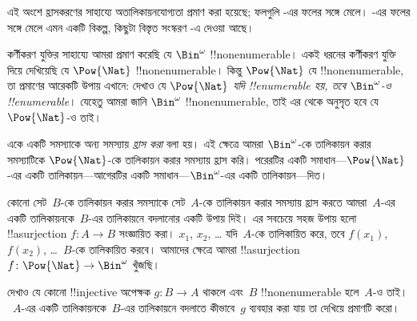 \documentclass[../../../include/open-logic-section]{subfiles}
\begin{document}


\begin{editorial}
  এই অংশে হ্রাসকরণের সাহায্যে অতালিকায়নযোগ্যতা প্রমাণ করা হয়েছে; ফলগুলি -এর ফলের সঙ্গে মেলে। -এর ফলের সঙ্গে মেলে এমন একটি বিকল্প, কিছুটা বিস্তৃত সংস্করণ -এ দেওয়া আছে।
\end{editorial}

কর্ণীকরণ যুক্তির সাহায্যে আমরা প্রমাণ করেছি যে $\Bin^\omega$ !!{nonenumerable}। একই ধরনের কর্ণীকরণ যুক্তি দিয়ে দেখিয়েছি যে $\Pow{\Nat}$ !!{nonenumerable}। কিন্তু $\Pow{\Nat}$ যে !!{nonenumerable}, তা প্রমাণের আরেকটি উপায় এখানে: দেখাও যে \emph{$\Pow{\Nat}$ যদি !!{enumerable} হয়, তবে $\Bin^\omega$-ও !!{enumerable}}। যেহেতু আমরা জানি $\Bin^\omega$ !!{nonenumerable}, তাই এর থেকে অনুসৃত হবে যে $\Pow{\Nat}$-ও তাই।

একে একটি সমস্যাকে অন্য সমস্যায় \emph{হ্রাস করা} বলা হয়। এই ক্ষেত্রে আমরা $\Bin^\omega$-কে তালিকায়ন করার সমস্যাটিকে $\Pow{\Nat}$-কে তালিকায়ন করার সমস্যায় হ্রাস করি। পরেরটির একটি সমাধান—$\Pow{\Nat}$-এর একটি তালিকায়ন—আগেরটির একটি সমাধান—$\Bin^\omega$-এর একটি তালিকায়ন—দিত।

কোনো সেট~$B$-কে তালিকায়ন করার সমস্যাকে সেট~$A$-কে তালিকায়ন করার সমস্যায় হ্রাস করতে আমরা~$A$-এর একটি তালিকায়নকে~$B$-এর তালিকায়নে বদলানোর একটি উপায় দিই। এর সবচেয়ে সহজ উপায় হলো !!a{surjection} $f\colon A \to B$ সংজ্ঞায়িত করা। $x_1$, $x_2$, \dots{} যদি~$A$-কে তালিকায়িত করে, তবে $f(x_1)$, $f(x_2)$, \dots{}~$B$-কে তালিকায়িত করবে। আমাদের ক্ষেত্রে আমরা !!a{surjection} $f\colon \Pow{\Nat}
\to \Bin^\omega$ খুঁজছি।

\begin{prob}
দেখাও যে কোনো !!{injective} অপেক্ষক $g\colon B \to A$ থাকলে এবং~$B$ !!{nonenumerable} হলে~$A$-ও তাই।~$A$-এর একটি তালিকায়নকে~$B$-এর তালিকায়নে বদলাতে কীভাবে~$g$ ব্যবহার করা যায় তা দেখিয়ে প্রমাণটি করো।
\end{prob}
\end{document}
